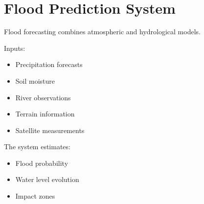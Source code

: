 \section{Flood Prediction System}


Flood forecasting combines atmospheric and hydrological models.



Inputs:


\begin{itemize}

\item Precipitation forecasts

\item Soil moisture

\item River observations

\item Terrain information

\item Satellite measurements

\end{itemize}



The system estimates:


\begin{itemize}

\item Flood probability

\item Water level evolution

\item Impact zones

\end{itemize}
